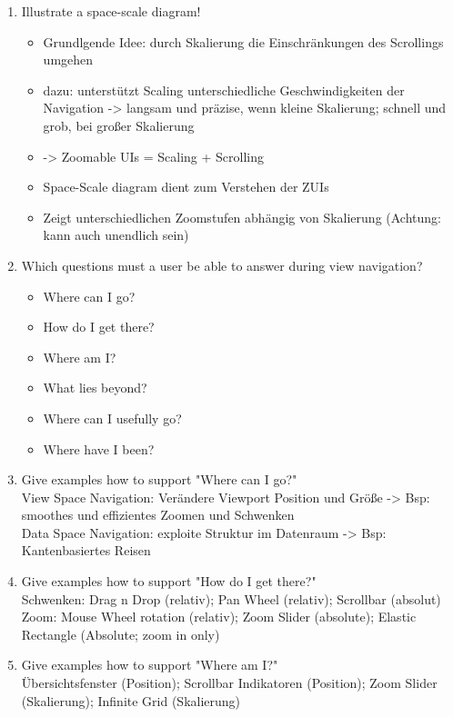 \begin{enumerate}
	\item Illustrate a space-scale diagram!
	\begin{itemize}
		\item Grundlgende Idee: durch Skalierung die Einschränkungen des Scrollings umgehen
		\item dazu: unterstützt Scaling unterschiedliche Geschwindigkeiten der Navigation -> langsam und präzise, wenn kleine Skalierung; schnell und grob, bei großer Skalierung
		\item -> Zoomable UIs = Scaling + Scrolling
		\item Space-Scale diagram dient zum Verstehen der ZUIs
		\item Zeigt unterschiedlichen Zoomstufen abhängig von Skalierung (Achtung: kann auch unendlich sein)
	\end{itemize}
	
	\item Which questions must a user be able to answer during view navigation?
	\begin{itemize}
		\item Where can I go?
		\item How do I get there?
		\item Where am I?
		\item What lies beyond?
		\item Where can I usefully go?
		\item Where have I been?
	\end{itemize}
	
	\item Give examples how to support "Where can I go?"\\
	View Space Navigation: Verändere Viewport Position und Größe -> Bsp: smoothes und effizientes Zoomen und Schwenken\\
	Data Space Navigation: exploite Struktur im Datenraum -> Bsp: Kantenbasiertes Reisen
	
	\item Give examples how to support "How do I get there?"\\
	Schwenken: Drag n Drop (relativ); Pan Wheel (relativ); Scrollbar (absolut)\\
	Zoom: Mouse Wheel rotation (relativ); Zoom Slider (absolute); Elastic Rectangle (Absolute; zoom in only)
	
	\item Give examples how to support "Where am I?"\\
	Übersichtsfenster (Position); Scrollbar Indikatoren (Position); Zoom Slider (Skalierung); Infinite Grid (Skalierung)
	

\end{enumerate}
